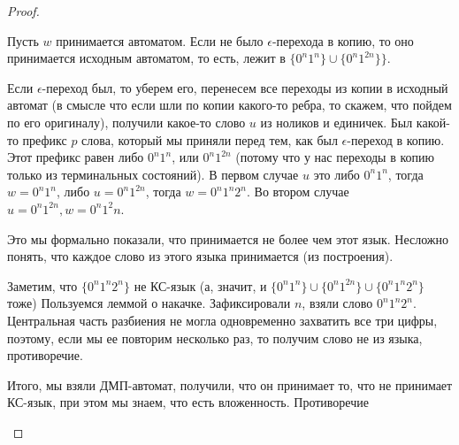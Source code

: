 \begin{proof}
\begin{description}
Пусть $w$ принимается автоматом. Если не было $\epsilon$-перехода в копию, то оно принимается исходным автоматом, то есть, лежит в $\{0^n1^n\} \cup \{0^n1^{2n}\}\}$.

Если $\epsilon$-переход был, то уберем его, перенесем все переходы из копии в исходный автомат (в смысле что если шли по копии какого-то ребра, то скажем, что пойдем по его оригиналу), 
получили какое-то слово $u$ из ноликов и единичек.
Был какой-то префикс $p$ слова, который мы приняли перед тем, как был $\epsilon$-переход в копию.
Этот префикс равен либо $0^n1^n$, или $0^n1^{2n}$ (потому что у нас переходы в копию только из терминальных состояний).
В первом случае $u$ это либо $0^n1^n$, тогда $w = 0^n1^n$, либо $u=0^n1^{2n}$, тогда $w = 0^n1^n2^n$.
Во втором случае $u = 0^n1^{2n}, w = 0^n1^2n$. 

Это мы формально показали, что принимается не более чем этот язык. Несложно понять, что каждое слово из этого языка принимается (из построения).

Заметим, что $\{0^n1^n2^n\}$ не КС-язык (а, значит, и $\{0^n1^n\} \cup \{0^n1^{2n}\} \cup \{0^n1^n2^n\}$ тоже)
Пользуемся леммой о накачке. Зафиксировали $n$, взяли слово $0^n1^n2^n$. 
Центральная часть разбиения не могла одновременно захватить все три цифры, поэтому, если мы ее повторим несколько раз, то получим слово не из языка, противоречие.

Итого, мы взяли ДМП-автомат, получили, что он принимает то, что не принимает КС-язык, при этом мы знаем, что есть вложенность.
Противоречие
    \end{description}
\end{proof}
